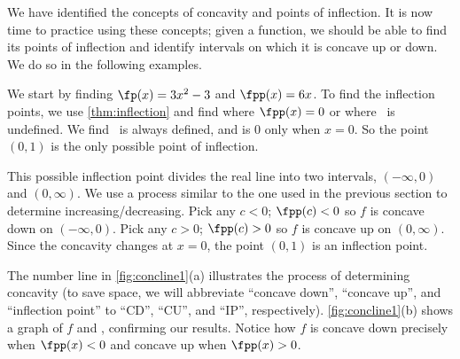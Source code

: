 We have identified the concepts of concavity and points of inflection. It is now time to practice using these concepts; given a function, we should be able to find its points of inflection and identify intervals on which it is concave up or down. We do so in the following examples.


{We start by finding $\fp(x)=3x^2-3$ and $\fpp(x)=6x$.  To find the inflection points, we use \autoref{thm:inflection} and find where $\fpp(x)=0$ or where \fpp\ is undefined. We find \fpp\ is always defined, and is 0 only when $x=0$. So the point $(0,1)$ is the only possible point of inflection.


This possible inflection point divides the real line into two intervals, $(-\infty,0)$ and $(0,\infty)$. We use a process similar to the one used in the previous section to determine increasing/decreasing. Pick any $c<0$; $\fpp(c)<0$ so $f$ is concave down on $(-\infty,0)$. Pick any $c>0$; $\fpp(c)>0$ so $f$ is concave up on $(0,\infty)$. Since the concavity changes at $x=0$, the point $(0,1)$ is an inflection point.

The number line in \autoref{fig:concline1}(a) illustrates the process of determining concavity (to save space, we will abbreviate ``concave down'', ``concave up'', and ``inflection point'' to ``CD'', ``CU'', and ``IP'', respectively). \autoref{fig:concline1}(b) shows a graph of $f$ and \fpp, confirming our results. Notice how $f$ is concave down precisely when $\fpp(x)<0$ and concave up when $\fpp(x)>0$.}

